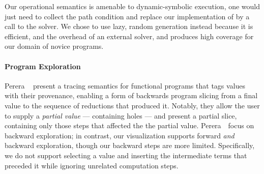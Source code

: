 Our operational semantics is amenable to dynamic-symbolic execution, one
would just need to collect the path condition and replace our
implementation of \gensym by a call to the solver. We chose to use lazy,
random generation instead because it is efficient, and %
the overhead of an external solver, and produces high coverage for our
domain of novice programs.


\paragraph{Program Exploration}
Perera \etal~\cite{Perera2012-dy} present a tracing semantics
for functional programs that tags values with their provenance, enabling
a form of backwards program slicing from a final value to the sequence
of reductions that produced it. Notably, they allow the user to supply a
\emph{partial value} --- containing holes --- and present a partial slice,
containing only those steps that affected the the partial value.
Perera~\etal\ focus on backward exploration; in contrast, our
visualization supports forward \emph{and} backward exploration, though
our backward steps are more limited.
%
Specifically, we do not support selecting a value and inserting the
intermediate terms that preceded it while ignoring unrelated computation
steps. %


